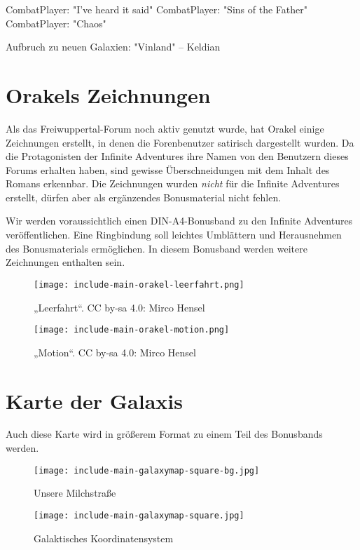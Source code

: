 CombatPlayer: "I've heard it said"
CombatPlayer: "Sins of the Father"
CombatPlayer: "Chaos"

Aufbruch zu neuen Galaxien: "Vinland" – Keldian












\chapter{Orakels Zeichnungen}

Als das Freiwuppertal-Forum noch aktiv genutzt wurde, hat Orakel einige Zeichnungen erstellt, in denen die Forenbenutzer satirisch dargestellt wurden. Da die Protagonisten der Infinite Adventures ihre Namen von den Benutzern dieses Forums erhalten haben, sind gewisse Überschneidungen mit dem Inhalt des Romans erkennbar. Die Zeichnungen wurden \textit{nicht} für die Infinite Adventures erstellt, dürfen aber als ergänzendes Bonusmaterial nicht fehlen.

Wir werden voraussichtlich einen DIN-A4-Bonusband zu den Infinite Adventures veröffentlichen. Eine Ringbindung soll leichtes Umblättern und Herausnehmen des Bonusmaterials ermöglichen. In diesem Bonusband werden weitere Zeichnungen enthalten sein.

\begin{figure}[p]
	\texttt{[image: include-main-orakel-leerfahrt.png]}
	\caption{„Leerfahrt“. CC by-sa 4.0: Mirco Hensel}
\end{figure}

\begin{figure}[p]
	\texttt{[image: include-main-orakel-motion.png]}
	\caption{„Motion“. CC by-sa 4.0: Mirco Hensel}
\end{figure}


\chapter{Karte der Galaxis}

Auch diese Karte wird in größerem Format zu einem Teil des Bonusbands werden.

\begin{figure}[p]
	\texttt{[image: include-main-galaxymap-square-bg.jpg]}
	\caption{Unsere Milchstraße}
\end{figure}

\begin{figure}[p]
	\texttt{[image: include-main-galaxymap-square.jpg]}
	\caption{Galaktisches Koordinatensystem}
\end{figure}


